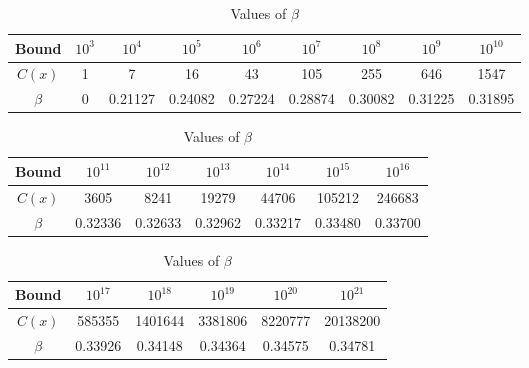 \documentclass[11pt]{article}
\theoremstyle{plain}
\theoremstyle{definition}
\theoremstyle{remark}
\numberwithin{equation}{subsection}
\begin{document}
\begin{table}[ht]
\caption{Values of $\beta$}
\centering
\begin{tabular}{ | c || c | c | c | c | c | c | c | c | }
    \hline
\textbf{Bound} & $10^{3}$ & $10^{4}$ & $10^{5}$ & $10^{6}$ & $10^{7}$ & $10^{8}$ & $10^{9}$ & $10^{10}$\\ \hline
\textbf{$C(x)$} & 1 & 7 & 16 & 43 & 105 & 255 & 646 & 1547\\ \hline
\textbf{$\beta$} & 0 & 0.21127 & 0.24082 & 0.27224 & 0.28874 & 0.30082 & 0.31225 & 0.31895\\ \hline
\end{tabular}
\vspace*{2mm}
\begin{tabular}{ | c || c | c | c | c | c | c | }
    \hline
\textbf{Bound} & $10^{11}$ & $10^{12}$ & $10^{13}$ & $10^{14}$ & $10^{15}$ & $10^{16}$\\ \hline
\textbf{$C(x)$} & 3605 & 8241 & 19279 & 44706 & 105212 & 246683\\ \hline
\textbf{$\beta$} & 0.32336 & 0.32633 & 0.32962 & 0.33217 & 0.33480 & 0.33700\\ \hline
\end{tabular}
\vspace*{2mm}
\begin{tabular}{ | c || c | c | c | c | c | }
    \hline
\textbf{Bound} & $10^{17}$ & $10^{18}$ & $10^{19}$ & $10^{20}$ & $10^{21}$\\ \hline
\textbf{$C(x)$} & 585355 & 1401644 & 3381806 & 8220777 & 20138200\\ \hline
\textbf{$\beta$} & 0.33926 & 0.34148 & 0.34364 & 0.34575 & 0.34781\\ \hline
\end{tabular}
\label{table5}
\end{table}
\newline
\end{document}
